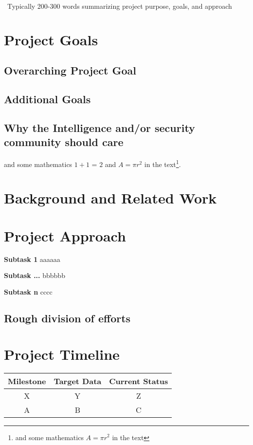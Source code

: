 \documentclass[letterpaper, 10pt]{article}
\begin{document}
\abstractname{~Typically 200-300 words summarizing project purpose, goals, and approach~}
\begin{multicols}{2}    
    \section{Project Goals}
        \subsection{Overarching Project Goal}
        \lipsum[1]
        \subsection{Additional Goals}
        \lipsum[2]
        \subsection{Why the Intelligence and/or security community should care}
        \lipsum[3]
        and some mathematics $1+1$ = $2$ and  $A=\pi r^2$ in the text\footnote{and some mathematics $A=\pi r^2$ in the text}.  
        
    \section{Background and Related Work}
        \lipsum[4]
    \section{Project Approach}
        \textbf{Subtask 1} aaaaaa
        
        \textbf{Subtask ...} bbbbbb
        
        \textbf{Subtask n} cccc

        \subsection{Rough division of efforts}
        
    \section{Project Timeline}
        \begin{center}
            \begin{tabular}{c|c|c}
                 Milestone  & Target Data   & Current Status  \\
                 \hline
                 X          & Y             & Z \\
                 A          & B             & C
            \end{tabular}
            \label{tab:my_label}
        \end{center}

\end{multicols}
\end{document}
